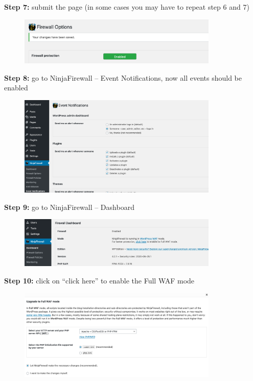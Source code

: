 \documentclass[a4paper]{article}
\begin{document}
\noindent
\textbf{Step 7:} submit the page (in some cases you may have to repeat step 6 and 7)

\begin{figure}[H]
  \centering
  \includegraphics[width=0.85\textwidth]{images/8.png}
\end{figure}

\noindent
\textbf{Step 8:} go to NinjaFirewall -- Event Notifications, now all events should be enabled

\begin{figure}[H]
  \centering
  \includegraphics[width=0.85\textwidth]{images/9.png}
\end{figure}

\newpage

\noindent
\textbf{Step 9:} go to NinjaFirewall -- Dashboard

\begin{figure}[H]
  \centering
  \includegraphics[width=0.85\textwidth]{images/10.png}
\end{figure}

\noindent
\textbf{Step 10:} click on \enquote{click here} to enable the Full WAF mode

\begin{figure}[H]
  \centering
  \includegraphics[width=0.85\textwidth]{images/11.png}
\end{figure}
\end{document}
